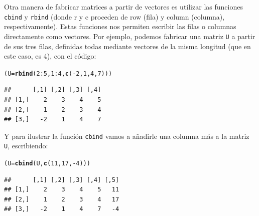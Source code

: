 \documentclass[10pt,a4paper]{article}\usepackage[]{graphicx}\usepackage[]{color}
\makeatletter
\newcommand{\hlnum}[1]{\textcolor[rgb]{0.686,0.059,0.569}{#1}}%
\newcommand{\hlopt}[1]{\textcolor[rgb]{0,0,0}{#1}}%
\newcommand{\hlstd}[1]{\textcolor[rgb]{0.345,0.345,0.345}{#1}}%
\newcommand{\hlkwb}[1]{\textcolor[rgb]{0.69,0.353,0.396}{#1}}%
\newcommand{\hlkwd}[1]{\textcolor[rgb]{0.737,0.353,0.396}{\textbf{#1}}}%
\newenvironment{kframe}{%
 \def\at@end@of@kframe{}%
 \ifinner\ifhmode%
  \def\at@end@of@kframe{\end{minipage}}%
  \begin{minipage}{\columnwidth}%
 \fi\fi%
 \def\FrameCommand##1{\hskip\@totalleftmargin \hskip-\fboxsep
 \colorbox{shadecolor}{##1}\hskip-\fboxsep
     \hskip-\linewidth \hskip-\@totalleftmargin \hskip\columnwidth}%
 \MakeFramed {\advance\hsize-\width
   \@totalleftmargin\z@ \linewidth\hsize
   \@setminipage}}%
 {\par\unskip\endMakeFramed%
 \at@end@of@kframe}
\newenvironment{knitrout}{}{} %
\makeatother
\begin{document}
Otra manera de fabricar matrices a partir de vectores es utilizar las funciones {\tt cbind} y {\tt rbind} (donde r y c proceden de row (fila) y column (columna), respectivamente). Estas funciones nos permiten escribir las filas o columnas directamente como vectores. Por ejemplo, podemos fabricar una matriz {\tt U} a partir de sus tres filas, definidas todas mediante vectores de la misma longitud (que en este caso, es $4$), con el código:
\begin{knitrout}
\color{fgcolor}\begin{kframe}
\begin{alltt}
    \hlstd{(U} \hlkwb{=} \hlkwd{rbind}\hlstd{(}\hlnum{2}\hlopt{:}\hlnum{5}\hlstd{,} \hlnum{1}\hlopt{:}\hlnum{4}\hlstd{,} \hlkwd{c}\hlstd{(}\hlopt{-}\hlnum{2}\hlstd{,}\hlnum{1}\hlstd{,}\hlnum{4}\hlstd{,}\hlnum{7}\hlstd{)))}
\end{alltt}
\begin{verbatim}
##      [,1] [,2] [,3] [,4]
## [1,]    2    3    4    5
## [2,]    1    2    3    4
## [3,]   -2    1    4    7
\end{verbatim}
\end{kframe}
\end{knitrout}
Y para ilustrar la función {\tt cbind} vamos a añadirle una columna más a la matriz {\tt U}, escribiendo:
\begin{knitrout}
\color{fgcolor}\begin{kframe}
\begin{alltt}
    \hlstd{(U} \hlkwb{=} \hlkwd{cbind}\hlstd{(U,} \hlkwd{c}\hlstd{(}\hlnum{11}\hlstd{,}\hlnum{17}\hlstd{,}\hlopt{-}\hlnum{4}\hlstd{)))}
\end{alltt}
\begin{verbatim}
##      [,1] [,2] [,3] [,4] [,5]
## [1,]    2    3    4    5   11
## [2,]    1    2    3    4   17
## [3,]   -2    1    4    7   -4
\end{verbatim}
\end{kframe}
\end{knitrout}
\end{document}
